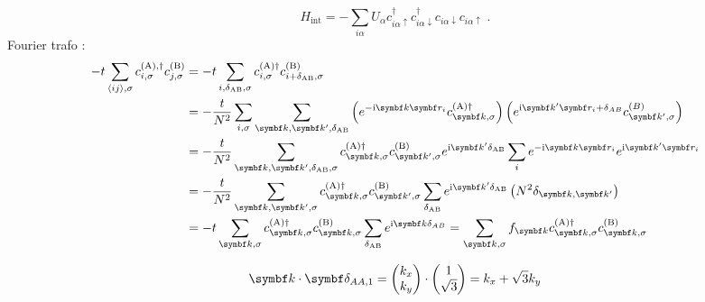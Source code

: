 \documentclass[../notes.tex]{subfiles}
\begin{document}
\begin{equation}
	H_{\mathrm{int}} = - \sum_{i \alpha} U_{\alpha} c_{i\alpha \uparrow}^{\dagger} c_{i\alpha \downarrow}^{\dagger} c_{i\alpha \downarrow} c_{i\alpha \uparrow}\;.
\end{equation}
Fourier trafo :
\begin{align}
	-t \sum_{\langle ij \rangle, \sigma} c_{i, \sigma}^{(\mathrm{A}), \dagger} c_{j, \sigma}^{(\mathrm{B})}
	&= -t \sum_{i,\delta_{\mathrm{AB}},\sigma} c_{i, \sigma}^{(\mathrm{A}) \dagger} c_{i + \delta_{\mathrm{AB}}, \sigma}^{(\mathrm{B})} \\
	&= -\frac{t}{N^2} \sum_{i,\sigma} \sum_{\vb{k}, \vb{k}^{\prime}, \delta_{\mathrm{AB}}} \left(e^{-\iu \vb{k} \vb{r}_i} c_{\vb{k}, \sigma}^{(\mathrm{A}) \dagger}\right) \left(e^{\iu \vb{k}^{\prime} \vb{r}_i +\delta_{AB}} c_{\vb{k}^{\prime}, \sigma}^{(B)} \right) \\
	&= -\frac{t}{N^2} \sum_{\vb{k}, \vb{k^{\prime}}, \delta_{\mathrm{AB}}, \sigma} c_{\vb{k}, \sigma}^{(\mathrm{A}) \dagger} c_{\vb{k}^{\prime}, \sigma}^{(\mathrm{B})} e^{\iu \vb{k}^{\prime} \delta_{\mathrm{AB}}} \sum_{i} e^{-\iu \vb{k} \vb{r}_i} e^{\iu \vb{k}^{\prime} \vb{r}_i} \\
	&= -\frac{t}{N^2} \sum_{\vb{k}, \vb{k^{\prime}}, \sigma}  c_{\vb{k}, \sigma}^{(\mathrm{A}) \dagger} c_{\vb{k}^{\prime}, \sigma}^{(\mathrm{B})} \sum_{\delta_{\mathrm{AB}}} e^{\iu \vb{k}^{\prime} \delta_{\mathrm{AB}}} \left(N^2 \delta_{\vb{k}, \vb{k}^{\prime}} \right)\\
	&= -t \sum_{\vb{k}, \sigma}  c_{\vb{k}, \sigma}^{(\mathrm{A}) \dagger} c_{\vb{k}, \sigma}^{(\mathrm{B})} \sum_{\delta_{\mathrm{AB}}} e^{\iu \vb{k} \delta_{AB}} = \sum_{\vb{k}, \sigma} f_{\vb{k}} c_{\vb{k}, \sigma}^{(\mathrm{A}) \dagger} c_{\vb{k}, \sigma}^{(\mathrm{B})}
\end{align}

\begin{align}
	\vb{k} \cdot \vb{\delta_{AA, 1}} = \begin{pmatrix} k_x \\ k_y \end{pmatrix} \cdot \begin{pmatrix} 1 \\ \sqrt{3} \end{pmatrix} = k_x + \sqrt{3} k_y
\end{align}
\end{document}
